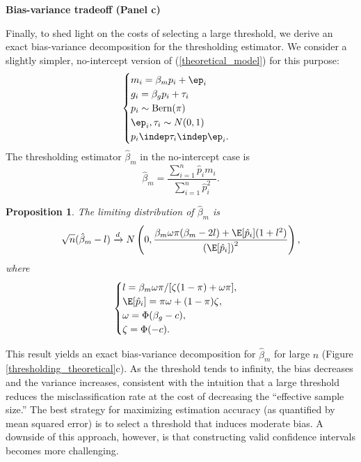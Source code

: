 \documentclass[12pt]{article}
\newtheorem{proposition}{Proposition}
\begin{document}
\begin{center}
	\textbf{Bias-variance tradeoff (Panel c)}
\end{center}

Finally, to shed light on the costs of selecting a large threshold, we derive an exact bias-variance decomposition for the thresholding estimator. We consider a slightly simpler, no-intercept version of (\ref{theoretical_model}) for this purpose:
\begin{equation}\label{theoretical_model_no_int}
\begin{cases}
m_i = \beta_m p_i + \ep_i \\
g_i = \beta_g p_i + \tau_i \\
p_i \sim \textrm{Bern}(\pi) \\
\ep_i, \tau_i \sim N(0,1) \\
p_i \indep \tau_i \indep \ep_i.
\end{cases}
\end{equation}
The thresholding estimator $\hat{\beta}_m$ in the no-intercept case is
\begin{equation}\label{thresh_estimator_no_int}
 \hat{\beta}_m = \frac{ \sum_{i=1}^n \hat{p}_i m_i }{\sum_{i=1}^n \hat{p}_i^2}. 
\end{equation}
\begin{proposition}\label{prop:bv_decomp}
The limiting distribution of $\hat{\beta}_m$ is
$$\sqrt{n}(\hat{\beta}_m - l) \xrightarrow{d} N\left(0, \frac{ \beta_m\omega\pi(\beta_m - 2l) + \E[\hat{p}_i](1 + l^2) }{\left(\E[\hat{p}_i]\right)^2} \right),$$ where
$$\begin{cases}
l = \beta_m\omega \pi/[\zeta(1-\pi) + \omega \pi], \\
\E[\hat{p}_i] = \pi \omega + (1-\pi) \zeta, \\
\omega = \Phi(\beta_g - c), \\
\zeta = \Phi(- c).\\
\end{cases}
$$
\end{proposition}
This result yields an exact bias-variance decomposition for $\hat{\beta}_m$ for large $n$ (Figure \ref{thresholding_theoretical}c). As the threshold tends to infinity, the bias decreases and the variance increases, consistent with the intuition that a large threshold reduces the misclassification rate at the cost of decreasing the ``effective sample size.'' The best strategy for maximizing estimation accuracy (as quantified by mean squared error) is to select a threshold that induces moderate bias. A downside of this approach, however, is that constructing valid confidence intervals becomes more challenging.
\end{document}
